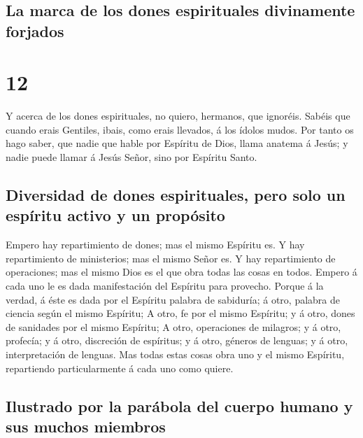 \hypertarget{la-marca-de-los-dones-espirituales-divinamente-forjados}{%
\subsection{La marca de los dones espirituales divinamente
forjados}\label{la-marca-de-los-dones-espirituales-divinamente-forjados}}

\hypertarget{section-11}{%
\section{12}\label{section-11}}

 Y acerca de los dones espirituales, no quiero, hermanos,
que ignoréis.  Sabéis que cuando erais Gentiles, ibais,
como erais llevados, á los ídolos mudos.  Por tanto os
hago saber, que nadie que hable por Espíritu de Dios, llama anatema á
Jesús; y nadie puede llamar á Jesús Señor, sino por Espíritu Santo.

\hypertarget{diversidad-de-dones-espirituales-pero-solo-un-espuxedritu-activo-y-un-propuxf3sito}{%
\subsection{Diversidad de dones espirituales, pero solo un espíritu
activo y un
propósito}\label{diversidad-de-dones-espirituales-pero-solo-un-espuxedritu-activo-y-un-propuxf3sito}}

 Empero hay repartimiento de dones; mas el mismo Espíritu
es.  Y hay repartimiento de ministerios; mas el mismo
Señor es.  Y hay repartimiento de operaciones; mas el
mismo Dios es el que obra todas las cosas en todos. 
Empero á cada uno le es dada manifestación del Espíritu para provecho.
 Porque á la verdad, á éste es dada por el Espíritu
palabra de sabiduría; á otro, palabra de ciencia según el mismo
Espíritu;  A otro, fe por el mismo Espíritu; y á otro,
dones de sanidades por el mismo Espíritu;  A otro,
operaciones de milagros; y á otro, profecía; y á otro, discreción de
espíritus; y á otro, géneros de lenguas; y á otro, interpretación de
lenguas.  Mas todas estas cosas obra uno y el mismo
Espíritu, repartiendo particularmente á cada uno como quiere.

\hypertarget{ilustrado-por-la-paruxe1bola-del-cuerpo-humano-y-sus-muchos-miembros}{%
\subsection{Ilustrado por la parábola del cuerpo humano y sus muchos
miembros}\label{ilustrado-por-la-paruxe1bola-del-cuerpo-humano-y-sus-muchos-miembros}}

